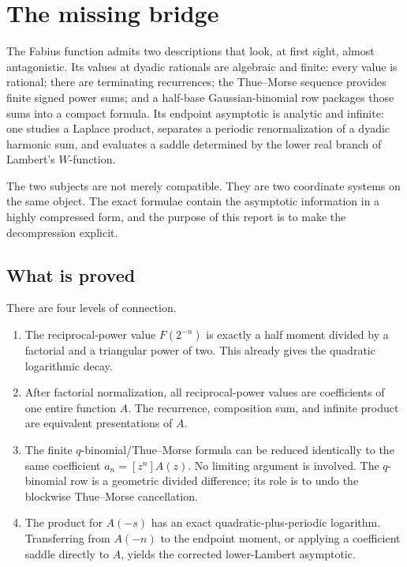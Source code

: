 \documentclass[11pt,oneside]{article}
\theoremstyle{definition}
\theoremstyle{remark}
\begin{document}
\begingroup\footnotesize
\tableofcontents
\endgroup
\newpage

\section{The missing bridge}
\label{sec:introduction}

The Fabius function admits two descriptions that look, at first sight, almost antagonistic.
Its values at dyadic rationals are algebraic and finite: every value is rational; there are
terminating recurrences; the Thue--Morse sequence provides finite signed power sums; and a
half-base Gaussian-binomial row packages those sums into a compact formula.  Its endpoint
asymptotic is analytic and infinite: one studies a Laplace product, separates a periodic
renormalization of a dyadic harmonic sum, and evaluates a saddle determined by the lower real
branch of Lambert's $W$-function.

The two subjects are not merely compatible.  They are two coordinate systems on the same
object.  The exact formulae contain the asymptotic information in a highly compressed form,
and the purpose of this report is to make the decompression explicit.

\subsection{What is proved}

There are four levels of connection.

\begin{enumerate}
\item The reciprocal-power value $F(2^{-n})$ is exactly a half moment divided by a factorial
and a triangular power of two.  This already gives the quadratic logarithmic decay.

\item After factorial normalization, all reciprocal-power values are coefficients of one
entire function $A$.  The recurrence, composition sum, and infinite product are equivalent
presentations of $A$.

\item The finite $q$-binomial/Thue--Morse formula can be reduced identically to the same
coefficient $a_n=[z^n]A(z)$.  No limiting argument is involved.  The $q$-binomial row is a
geometric divided difference; its role is to undo the blockwise Thue--Morse cancellation.

\item The product for $A(-s)$ has an exact quadratic-plus-periodic logarithm.  Transferring
from $A(-n)$ to the endpoint moment, or applying a coefficient saddle directly to $A$, yields
the corrected lower-Lambert asymptotic.
\end{enumerate}
\end{document}

